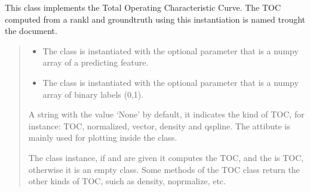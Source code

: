 \documentclass[letterpaper,10pt,english]{sphinxmanual}
\begin{document}
\begin{fulllineitems}
\label{\detokenize{usage:ootoc.TOC}}
\pysigstartsignatures
{}
\pysigstopsignatures
\sphinxAtStartPar
This class implements the Total Operating Characteristic Curve. The TOC computed from a rankl and groundtruth using this instantiation is named  trought the document.
\begin{quote}\begin{description}
\begin{itemize}
\item {} 
\sphinxAtStartPar
{} \textendash{} The class is instantiated with the optional parameter  that is a numpy array of a predicting feature.

\item {} 
\sphinxAtStartPar
{} \textendash{} The class is instantiated with the optional parameter  that is a numpy array of binary labels (0,1).

\end{itemize}

\sphinxAtStartPar
{} \textendash{} A string with the value ‘None’ by default, it indicates the kind of TOC, for instance: TOC, normalized, vector, density and qspline. The  attibute is mainly used for plotting inside the class.

\sphinxAtStartPar
The class instance, if  and  are given it computes the TOC, and the  is TOC, otherwise it is an empty class. Some methods of the TOC class return the other kinds of TOC, suich as density, noprmalize, etc.

\sphinxAtStartPar
{}

\end{description}\end{quote}

\end{fulllineitems}
\end{document}
